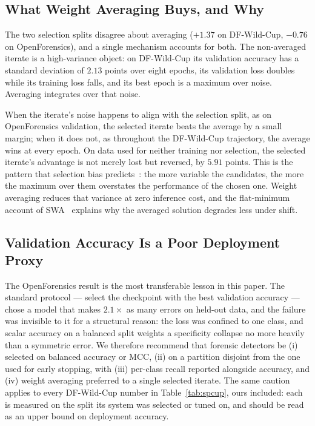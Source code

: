 \documentclass[10pt,journal]{IEEEtran}
\begin{document}
\subsection{What Weight Averaging Buys, and Why}
The two selection splits disagree about averaging ($+1.37$ on DF-Wild-Cup,
$-0.76$ on OpenForensics), and a single mechanism accounts for both. The
non-averaged iterate is a high-variance object: on DF-Wild-Cup its validation
accuracy has a standard deviation of $2.13$ points over eight epochs, its
validation loss doubles while its training loss falls, and its best epoch is a
maximum over noise. Averaging integrates over that noise.

When the iterate's noise happens to align with the selection split, as on
OpenForensics validation, the selected iterate beats the average by a small
margin; when it does not, as throughout the DF-Wild-Cup trajectory, the average
wins at every epoch. On data used for neither training nor selection, the
selected iterate's advantage is not merely lost but reversed, by $5.91$ points.
This is the pattern that selection bias predicts~\cite{cawley2010overfitting}:
the more variable the candidates, the more the maximum over them overstates the
performance of the chosen one. Weight averaging reduces that variance at zero
inference cost, and the flat-minimum account of SWA~\cite{izmailov2018swa}
explains why the averaged solution degrades less under shift.

\subsection{Validation Accuracy Is a Poor Deployment Proxy}
The OpenForensics result is the most transferable lesson in this paper. The
standard protocol --- select the checkpoint with the best validation accuracy
--- chose a model that makes $2.1\times$ as many errors on held-out data, and the
failure was invisible to it for a structural reason: the loss was confined to
one class, and scalar accuracy on a balanced split weights a specificity
collapse no more heavily than a symmetric error. We therefore recommend that
forensic detectors be (i) selected on balanced accuracy or MCC, (ii) on a
partition disjoint from the one used for early stopping, with (iii) per-class
recall reported alongside accuracy, and (iv) weight averaging preferred to a
single selected iterate. The same caution applies to every DF-Wild-Cup number
in Table~\ref{tab:spcup}, ours included: each is measured on the split its
system was selected or tuned on, and should be read as an upper bound on
deployment accuracy.
\end{document}
